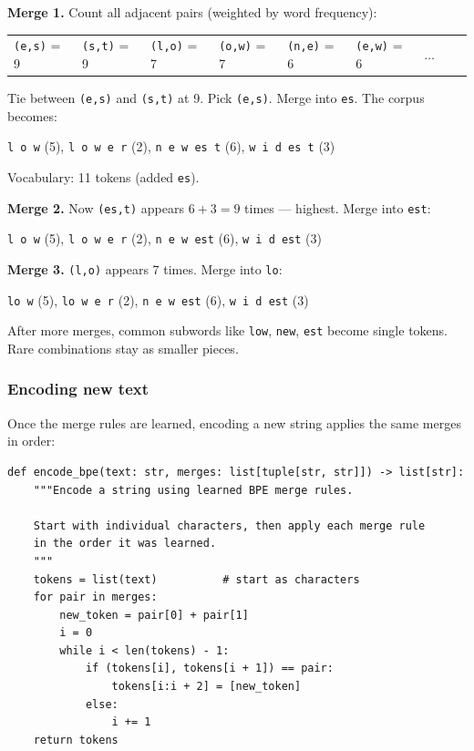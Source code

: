 \textbf{Merge 1.} Count all adjacent pairs (weighted by word frequency):

\begin{center}
\begin{tabular}{lllllllll}
\texttt{(e,s)} = 9 &
\texttt{(s,t)} = 9 &
\texttt{(l,o)} = 7 &
\texttt{(o,w)} = 7 &
\texttt{(n,e)} = 6 &
\texttt{(e,w)} = 6 &
$\ldots$
\end{tabular}
\end{center}

Tie between \texttt{(e,s)} and \texttt{(s,t)} at 9. Pick \texttt{(e,s)}. Merge into \texttt{es}. The corpus becomes:

\begin{center}
\texttt{l o w} (5), \quad \texttt{l o w e r} (2), \quad \texttt{n e w es t} (6), \quad \texttt{w i d es t} (3)
\end{center}

Vocabulary: 11 tokens (added \texttt{es}).

\textbf{Merge 2.} Now \texttt{(es,t)} appears $6 + 3 = 9$ times --- highest. Merge into \texttt{est}:

\begin{center}
\texttt{l o w} (5), \quad \texttt{l o w e r} (2), \quad \texttt{n e w est} (6), \quad \texttt{w i d est} (3)
\end{center}

\textbf{Merge 3.} \texttt{(l,o)} appears 7 times. Merge into \texttt{lo}:

\begin{center}
\texttt{lo w} (5), \quad \texttt{lo w e r} (2), \quad \texttt{n e w est} (6), \quad \texttt{w i d est} (3)
\end{center}

After more merges, common subwords like \texttt{low}, \texttt{new}, \texttt{est} become single tokens. Rare combinations stay as smaller pieces.

\subsubsection{Encoding new text}

Once the merge rules are learned, encoding a new string applies the same merges in order:

\concepttag
\begin{lstlisting}
def encode_bpe(text: str, merges: list[tuple[str, str]]) -> list[str]:
    """Encode a string using learned BPE merge rules.

    Start with individual characters, then apply each merge rule
    in the order it was learned.
    """
    tokens = list(text)          # start as characters
    for pair in merges:
        new_token = pair[0] + pair[1]
        i = 0
        while i < len(tokens) - 1:
            if (tokens[i], tokens[i + 1]) == pair:
                tokens[i:i + 2] = [new_token]
            else:
                i += 1
    return tokens
\end{lstlisting}

